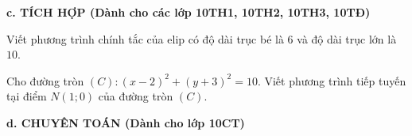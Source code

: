 \begin{flushleft}
	\textbf{c. TÍCH HỢP (Dành cho các lớp 10TH1, 10TH2, 10TH3, 10TĐ)}
\end{flushleft}

\begin{bt}%
	Viết phương trình chính tắc của elip có độ dài trục bé là $ 6 $ và độ dài trục lớn là $ 10 $.
\end{bt}

\begin{bt}%
	Cho đường tròn $ (C)\colon (x-2)^2+(y+3)^2=10 $. Viết phương trình tiếp tuyến tại điểm $ N(1;0) $ của đường tròn $(C)$.
\end{bt}

\begin{flushleft}
	\textbf{d. CHUYÊN TOÁN (Dành cho lớp 10CT)}
\end{flushleft}

